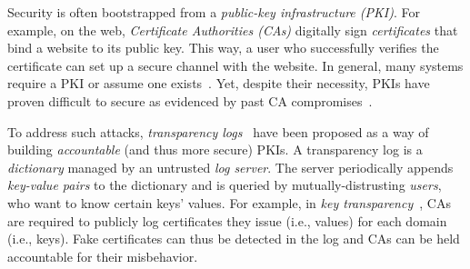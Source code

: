 {\begin{table}
\begin{tabular}{lcccc}
    \end{tabular}
    \vspace{-4em}
\end{table}
}

Security is often bootstrapped from a \textit{public-key infrastructure (PKI)}.
For example, on the web, \textit{Certificate Authorities (CAs)} digitally sign \textit{certificates} that bind a website to its public key.
This way, a user who successfully verifies the certificate can set up a secure channel with the website.
In general, many systems require a PKI or assume one exists~\cite{frientegrity,sundrosdi,mylar,sporc}.
Yet, despite their necessity, PKIs have proven difficult to secure as evidenced by past CA compromises~\cite{mitmgoogle,cahacks,cahacksurvey}.

To address such attacks, \textit{transparency logs}~\cite{ht,ct,general-transparency} have been proposed as a way of building \textit{accountable} (and thus more secure) PKIs.
A transparency log is a \textit{dictionary} managed by an untrusted \textit{log server}.
The server periodically appends \textit{key-value pairs} to the dictionary   and is queried by mutually-distrusting \textit{users}, who want to know certain keys' values.
For example, in \textit{key transparency}~\cite{ct,ect,coniks,aki,arpki,BuldasLaudLipmaa2000,policert,dtki}, CAs are required to publicly log certificates they issue (i.e., values) for each domain (i.e., keys).
Fake certificates can thus be detected in the log and CAs can be held accountable for their misbehavior.

